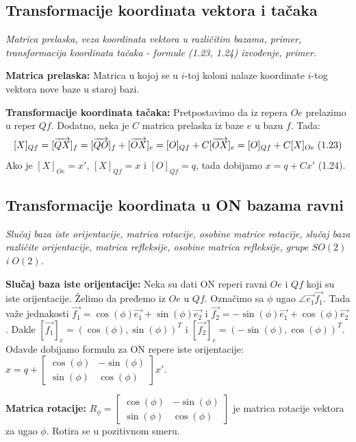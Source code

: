 \documentclass[12pt]{article}
\newcommand{\vek}[1]{\overrightarrow{#1}}
\begin{document}
\subsection{Transformacije koordinata vektora i tačaka}
\textit{Matrica prelaska, veza koordinata vektora u različitim bazama,
    primer, transformacija koordinata tačaka - formule (1.23, 1.24)
    izvođenje, primer.}
\par
\vspace*{1cm}

\textbf{Matrica prelaska:} Matrica u kojoj se u $i$-toj koloni nalaze
koordinate $i$-tog vektora nove baze u staroj bazi.
\par

\textbf{Transformacije koordinata tačaka:} Pretpostavimo da iz repera $Oe$
prelazimo u reper $Qf$. Dodatno, neka je $C$ matrica prelaska iz baze $e$ u
bazu $f$. Tada:
$$[X]_{Qf}=[\vek{QX}]_f=[\vek{QO}]_f+[\vek{OX}]_e=[O]_{Qf}+C[\vek{OX}]_e
    =[O]_{Qf}+C[X]_{Oe}\hspace*{0.1cm}\text{(1.23)}$$
Ako je $[X]_{Oe}=x'$, $[X]_{Qf}=x$ i $[O]_{Qf}=q$, tada dobijamo $x=q+Cx'$
(1.24).

\subsection{Transformacije koordinata u ON bazama ravni}
\label{subsec:pitanje_9}
\textit{Slučaj baza iste orijentacije, matrica rotacije, osobine matrice
    rotacije, slučaj baza različite orijentacije, matrica refleksije,
    osobine matrica refleksije, grupe $SO(2)$ i $O(2)$.}
\par
\vspace*{1cm}

\textbf{Slučaj baza iste orijentacije:} Neka su dati ON reperi ravni $Oe$ i
$Qf$ koji su iste orijentacije. Želimo da pređemo iz $Oe$ u $Qf$. Označimo sa
$\phi$ ugao $\angle{\vek{e_1}\vek{f_1}}$. Tada važe jednakosti
$\vek{f_1}=\cos(\phi)\vek{e_1}+\sin(\phi)\vek{e_2}$ i
$\vek{f_2}=-\sin(\phi)\vek{e_1}+\cos(\phi)\vek{e_2}$. Dakle
$[\vek{f_1}]_e=(\cos(\phi),\sin(\phi))^T$ i $[\vek{f_2}]_e
    =(-\sin(\phi),\cos(\phi))^T$. Odavde dobijamo formulu za ON repere iste
orijentacije: $x=q+\begin{bmatrix}
        \cos(\phi) & -\sin(\phi) \\
        \sin(\phi) & \cos(\phi)
    \end{bmatrix} x'$.
\par

\textbf{Matrica rotacije:} $R_\phi=\begin{bmatrix}
        \cos(\phi) & -\sin(\phi) \\
        \sin(\phi) & \cos(\phi)
    \end{bmatrix}$ je matrica rotacije vektora za ugao $\phi$. Rotira se u
pozitivnom smeru.
\par
\end{document}
